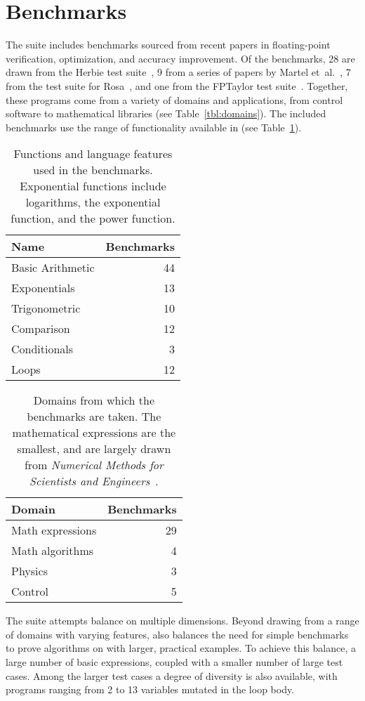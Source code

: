 \documentclass[main.tex]{subfiles}
\begin{document}
\section{Benchmarks}
\label{sec:benchmarks}

The \name suite includes \nbenches benchmarks
  sourced from recent papers in floating-point verification,
  optimization, and accuracy improvement.
Of the benchmarks,
  28 are drawn from the Herbie test suite~\cite{pavel15},
  9 from a series of papers by Martel et~al.~\cite{fmics15},
  7 from the test suite for Rosa~\cite{DarulovaK14},
  and one from the FPTaylor test suite~\cite{fptaylor-fm15}.
Together, these programs come from
  a variety of domains and applications,
  from control software to mathematical libraries
  (see Table~\ref{tbl:domains}).
The included benchmarks use the range of functionality
  available in \name (see Table~\ref{tbl:features}).

\begin{table}[hbtp]
  \begin{tabular}{lr}
    Name & Benchmarks \\\hline
    Basic Arithmetic & 44 \\
    Exponentials & 13 \\
    Trigonometric & 10 \\
    Comparison & 12 \\
    Conditionals & 3 \\
    Loops & 12
  \end{tabular}
  \caption{Functions and language features used in the \name
    benchmarks. Exponential functions include logarithms, the
    exponential function, and the power function.}
  \label{tbl:features}
\end{table}

\begin{table}[hbtp]
  \begin{tabular}{lr}
    Domain & Benchmarks \\\hline
    Math expressions & 29 \\
    Math algorithms & 4 \\
    Physics & 3 \\
    Control & 5 \\
  \end{tabular}
  \caption{Domains from which the \name benchmarks are taken. The
    mathematical expressions are the smallest, and are largely
    drawn from \textit{Numerical Methods for Scientists and
      Engineers}~\cite{hamming-1987}.}
\end{table}

The \name suite attempts balance on multiple dimensions.
Beyond drawing from a range of domains with varying features,
  \name also balances the need for simple benchmarks
  to prove algorithms on
  with larger, practical examples.
To achieve this balance,
  a large number of basic expressions,
  coupled with a smaller number of large test cases.
Among the larger test cases a degree of diversity is also available,
  with programs ranging
  from 2 to 13 variables mutated in the loop body.
\end{document}
